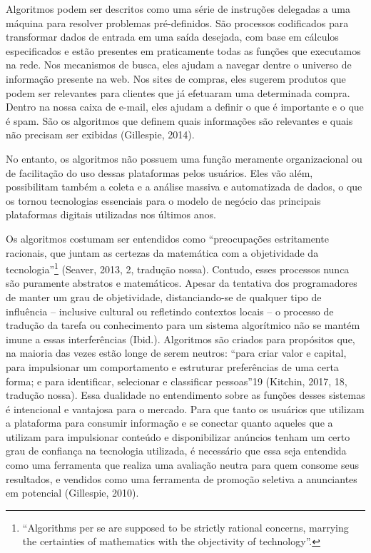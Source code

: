 Algoritmos podem ser descritos como uma série de instruções delegadas a
uma máquina para resolver problemas pré-definidos. São processos
codificados para transformar dados de entrada em uma saída desejada, com
base em cálculos especificados e estão presentes em praticamente todas
as funções que executamos na rede. Nos mecanismos de busca, eles ajudam
a navegar dentre o universo de informação presente na web. Nos sites de
compras, eles sugerem produtos que podem ser relevantes para clientes
que já efetuaram uma determinada compra. Dentro na nossa caixa de
e-mail, eles ajudam a definir o que é importante e o que é spam. São os
algoritmos que definem quais informações são relevantes e quais não
precisam ser exibidas (Gillespie, 2014).

No entanto, os algoritmos não possuem uma função meramente
organizacional ou de facilitação do uso dessas plataformas pelos
usuários. Eles vão além, possibilitam também a coleta e a análise
massiva e automatizada de dados, o que os tornou tecnologias essenciais
para o modelo de negócio das principais plataformas digitais utilizadas
nos últimos anos.

Os algoritmos costumam ser entendidos como ``preocupações estritamente
racionais, que juntam as certezas da matemática com a objetividade da
tecnologia''\footnote{``Algorithms per se are supposed to be strictly
  rational concerns, marrying the certainties of mathematics with the
  objectivity of technology''.} (Seaver, 2013, 2, tradução nossa).
Contudo, esses processos nunca são puramente abstratos e matemáticos.
Apesar da tentativa dos programadores de manter um grau de objetividade,
distanciando-se de qualquer tipo de influência -- inclusive cultural ou
refletindo contextos locais -- o processo de tradução da tarefa ou
conhecimento para um sistema algorítmico não se mantém imune a essas
interferências (Ibid.). Algoritmos são criados para propósitos que, na
maioria das vezes estão longe de serem neutros: ``para criar valor e
capital, para impulsionar um comportamento e estruturar preferências de
uma certa forma; e para identificar, selecionar e classificar
pessoas''19 (Kitchin, 2017, 18, tradução nossa). Essa dualidade no
entendimento sobre as funções desses sistemas é intencional e vantajosa
para o mercado. Para que tanto os usuários que utilizam a plataforma
para consumir informação e se conectar quanto aqueles que a utilizam
para impulsionar conteúdo e disponibilizar anúncios tenham um certo grau
de confiança na tecnologia utilizada, é necessário que essa seja
entendida como uma ferramenta que realiza uma avaliação neutra para quem
consome seus resultados, e vendidos como uma ferramenta de promoção
seletiva a anunciantes em potencial (Gillespie, 2010).

